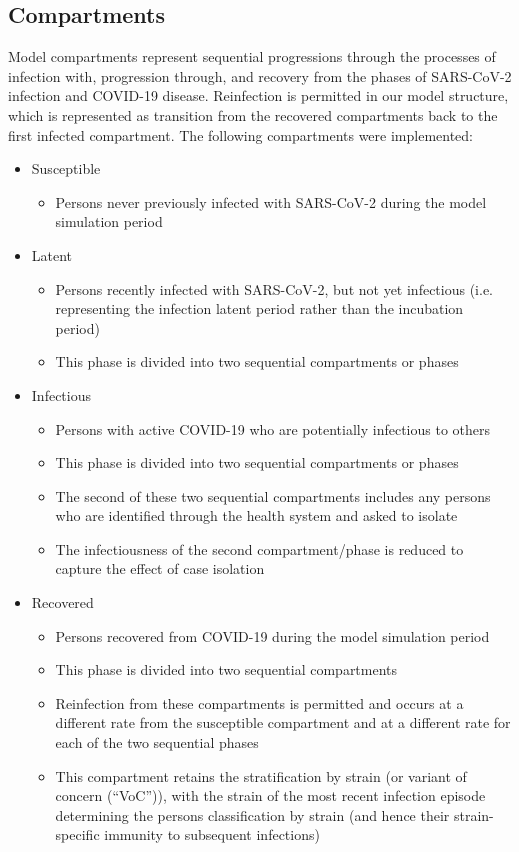\subsection{Compartments}
Model compartments represent sequential progressions through the processes of 
infection with, progression through, and recovery from the phases of SARS-CoV-2
infection and COVID-19 disease.
Reinfection is permitted in our model structure, 
which is represented as transition from the recovered compartments 
back to the first infected compartment.
The following compartments were implemented:
\begin{itemize}
    \item Susceptible
    \begin{itemize}
        \item Persons never previously infected with SARS-CoV-2 during the model simulation period
    \end{itemize}
    \item Latent
    \begin{itemize}
        \item Persons recently infected with SARS-CoV-2, but not yet infectious 
        (i.e. representing the infection latent period rather than the incubation period)
        \item This phase is divided into two sequential compartments or phases
    \end{itemize}
    \item Infectious
    \begin{itemize}
        \item Persons with active COVID-19 who are potentially infectious to others
        \item This phase is divided into two sequential compartments or phases
        \item The second of these two sequential compartments 
        includes any persons who are identified through the health system and asked to isolate
        \item The infectiousness of the second compartment/phase 
        is reduced to capture the effect of case isolation
    \end{itemize}
    \item Recovered
    \begin{itemize}
        \item Persons recovered from COVID-19 during the model simulation period
        \item This phase is divided into two sequential compartments
        \item Reinfection from these compartments is permitted 
        and occurs at a different rate from the susceptible compartment 
        and at a different rate for each of the two sequential phases
        \item This compartment retains the stratification by strain 
        (or variant of concern (``VoC'')), 
        with the strain of the most recent infection episode
        determining the persons classification by strain
        (and hence their strain-specific immunity to subsequent infections)
    \end{itemize}
\end{itemize}
